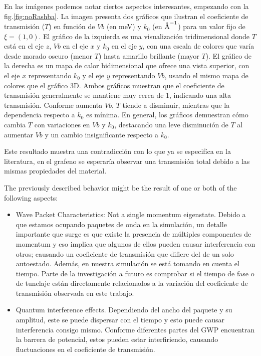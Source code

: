     En las imágenes podemos notar ciertos aspectos interesantes, empezando con la fig.\ref{fig:noRashba}.
    La imagen presenta dos gráficos que ilustran el coeficiente de transmisión ($T$) en función de $Vb$ (en meV) y $k_0$ (en $\textup{\AA}^{-1}$) para un valor fijo de $\xi = (1, 0)$.
    El gráfico de la izquierda es una visualización tridimensional donde $T$ está en el eje $z$, $Vb$ en el eje $x$ y $k_0$ en el eje $y$, con una escala de colores que varía desde morado oscuro (menor $T$) hasta amarillo brillante (mayor $T$). El gráfico de la derecha es un mapa de calor bidimensional que ofrece una vista superior, con el eje $x$ representando $k_0$ y el eje $y$ representando $Vb$, usando el mismo mapa de colores que el gráfico 3D\@.
    Ambos gráficos muestran que el coeficiente de transmisión generalmente se mantiene muy cerca de 1, indicando una alta transmisión.
    Conforme aumenta $Vb$, $T$ tiende a disminuir, mientras que la dependencia respecto a $k_0$ es mínima.
    En general, los gráficos demuestran cómo cambia $T$ con variaciones en $Vb$ y $k_0$, destacando una leve disminución de $T$ al aumentar $Vb$ y un cambio insignificante respecto a $k_0$.

    Este resultado muestra una contradicción con lo que ya se especifíca en la literatura, en el grafeno se esperaría observar una transmisión total debido a las mismas propiedades del material\cite{horsell2008, Young2009}.

    The previously described behavior might be the result of one or both of the following aspects:

    \begin{itemize}
        \item Wave Packet Characteristics:
        Not a single momentum eigenstate.
        Debido a que estamos ocupando paquetes de onda en la simulación, un detalle importante que surge es que existe la presencia de múltiples componentes de momentum y eso implica que algunos de ellos pueden causar interferencia con otros; causando un coeficiente de transmisión que difiere del de un solo autoestado\cite{Staelens2021}.
        Además, en nuestra simulación se está tomando en cuenta el tiempo.
        Parte de la investigación a futuro es comprobar si el tiempo de fase o de tunelaje están directamente relacionados a la variación del coeficiente de transmisión observada en este trabajo.
        \item Quantum interference effects\cite{MolgadoMex2018}.
        Dependiendo del ancho del paquete y su amplitud, este se puede dispersar con el tiempo y esto puede causar interferencia consigo mismo.
        Conforme diferentes partes del GWP encuentran la barrera de potencial, estos pueden estar interfiriendo, causando fluctuaciones en el coeficiente de transmisión.
    \end{itemize}

